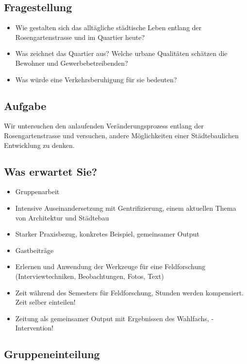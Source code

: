 \documentclass[a4paper,11pt,ngerman]{article}
\begin{document}
\subsection{Fragestellung}
\label{sec-1-2}

\begin{itemize}
\item Wie gestalten sich das alltägliche städtische Leben entlang der
Rosengartenstrasse und im Quartier heute?
\item Was zeichnet das Quartier aus? Welche urbane Qualitäten schätzen die
Bewohner und Gewerbebetreibenden?
\item Was würde eine Verkehrsberuhigung für sie bedeuten?
\end{itemize}

\subsection{Aufgabe}
\label{sec-1-3}

Wir untersuchen den anlaufenden Veränderungsprozess entlang der
Rosengartenstrasse und versuchen, andere Möglichkeiten einer Städtebaulichen
Entwicklung zu denken.

\subsection{Was erwartet Sie?}
\label{sec-1-4}

\begin{itemize}
\item Gruppenarbeit
\item Intensive Auseinandersetzung mit Gentrifizierung, einem aktuellen Thema von
Architektur und Städtebau
\item Starker Praxisbezug, konkretes Beispiel, gemeinsamer Output
\item Gastbeiträge
\item Erlernen und Anwendung der Werkzeuge für eine Feldforschung
(Interviewtechniken, Beobachtungen, Fotos, Text)
\item Zeit während des Semesters für Feldforschung, Stunden werden
kompensiert. Zeit selber einteilen!
\item Zeitung als gemeinsamer Output mit Ergebnissen des Wahlfachs, -
Intervention!
\end{itemize}

\subsection{Gruppeneinteilung}
\label{sec-1-5}
\end{document}
